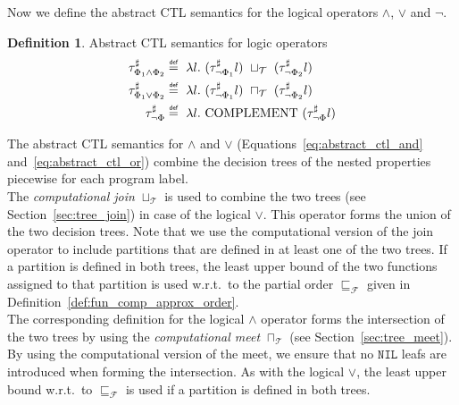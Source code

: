 \documentclass[11pt,a4paper,titlepage]{article}
\theoremstyle{definition}
\newtheorem{definition}{Definition}[section]
\newcommand\eqdef{\mathrel{\overset{\makebox[0pt]{\mbox{\normalfont\tiny\sffamily def}}}{=}}}
\begin{document}
Now we define the abstract CTL semantics for the logical operators $\land$, $\lor$ and $\neg$.

\begin{definition}\label{def:abstract_ctl_semantics_logic_operators}
    Abstract CTL semantics for logic operators
    \begin{align}
        \tau^{\sharp}_{\Phi_1 \land \Phi_2} &\eqdef \ \lambda l. \ (\tau^{\sharp}_{\neg \Phi_1}l) \ \sqcup_{\mathcal{T}} \ (\tau^{\sharp}_{\neg \Phi_2}l)
        \label{eq:abstract_ctl_and}\\
        \tau^{\sharp}_{\Phi_1 \lor \Phi_2} &\eqdef \ \lambda l. \ (\tau^{\sharp}_{\neg \Phi_1}l) \ \sqcap_{\mathcal{T}} \ (\tau^{\sharp}_{\neg \Phi_2}l)
        \label{eq:abstract_ctl_or}\\
        \tau^{\sharp}_{\neg \Phi} &\eqdef \ \lambda l. \ \text{COMPLEMENT} \ (\tau^{\sharp}_{\neg \Phi}l)
        \label{eq:abstract_ctl_not}
    \end{align}
\end{definition}

The abstract CTL semantics for $\land$ and $\lor$ (Equations~\ref{eq:abstract_ctl_and} and~\ref{eq:abstract_ctl_or}) combine the decision trees
of the nested properties piecewise for each program label.\\

The \textit{computational join} $\sqcup_{\mathcal{T}}$ is used to combine the two trees (see Section~\ref{sec:tree_join}) in
case of the logical $\lor$. This operator forms the union of the two decision trees. 
Note that we use the computational version of the join operator to include partitions that are defined in at least one of the two trees. 
If a partition is defined in both trees, the least upper bound of the two functions assigned to that partition is used w.r.t.\ to the 
partial order $\sqsubseteq_{\mathcal{F}}$ given in Definition~\ref{def:fun_comp_approx_order}.\\

The corresponding definition for the logical $\land$ operator forms the intersection of the two trees by using the
\textit{computational meet} $\sqcap_{\mathcal{T}}$ (see Section~\ref{sec:tree_meet}). 
By using the computational version of the meet, we ensure that no $\mathtt{NIL}$ leafs are introduced when forming the intersection.
As with the logical $\lor$, the least upper bound w.r.t.\ to $\sqsubseteq_{\mathcal{F}}$ is used if a partition is defined in both trees.\\
\end{document}
